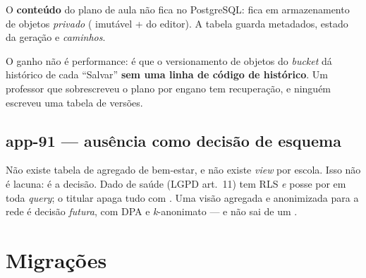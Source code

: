 \begin{decisao}
O \textbf{conteúdo} do plano de aula não fica no PostgreSQL: fica em
armazenamento de objetos \emph{privado}
( imutável +
 do editor). A tabela guarda metadados, estado da geração e
\emph{caminhos}.

O ganho não é performance: é que o versionamento de objetos do \emph{bucket} dá
histórico de cada \enquote{Salvar} \textbf{sem uma linha de código de
histórico}. Um professor que sobrescreveu o plano por engano tem recuperação, e
ninguém escreveu uma tabela de versões.
\end{decisao}

\subsection{app-91 --- ausência como decisão de esquema}

\begin{decisao}
Não existe tabela de agregado de bem-estar, e não existe \emph{view} por escola.
Isso não é lacuna: é a decisão. Dado de saúde (LGPD art.~11) tem RLS \emph{e}
posse por  em toda \emph{query}; o titular apaga tudo com
. Uma visão agregada e anonimizada para a rede é
decisão \emph{futura}, com DPA e \emph{k}-anonimato --- e não sai de um
.
\end{decisao}

\section{Migrações}


